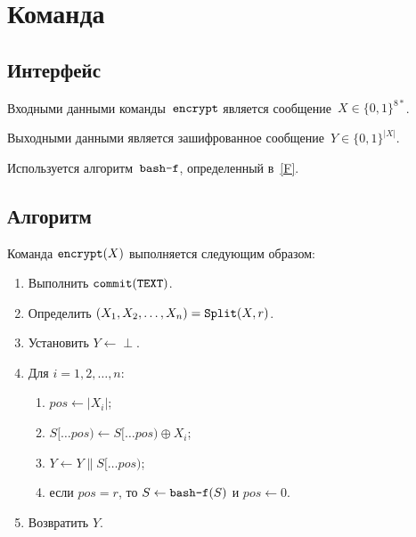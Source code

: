 \section{Команда }\label{PRG.Encrypt}

\subsection{Интерфейс}\label{PRG.Encrypt.IFace}

Входными данными команды~$\texttt{encrypt}$ является 
сообщение~$X\in\{0,1\}^{8*}$.

Выходными данными является зашифрованное сообщение~$Y\in\{0,1\}^{|X|}$.

Используется алгоритм~$\texttt{bash-f}$, определенный в~\ref{F}.

\subsection{Алгоритм}\label{PRG.Encrypt.Alg}

Команда $\texttt{encrypt}(X)$ выполняется следующим образом:
\begin{enumerate}
\item
Выполнить
$\texttt{commit}(\texttt{TEXT})$.
\item
Определить $(X_1,X_2,\ldots,X_n)=\mathop{\texttt{Split}}\nolimits(X,r)$.
\item
Установить $Y\leftarrow\perp$. 
\item
Для $i=1,2,\ldots,n$:
\begin{enumerate}
\item
$pos\leftarrow |X_i|$;
\item
$S[\dots pos)\leftarrow S[\dots pos)\oplus X_i$;
\item
$Y\leftarrow Y\parallel S[\dots pos)$;
\item
если $pos=r$, то 
$S\leftarrow\texttt{bash-f}(S)$ и $pos\leftarrow 0$.
\end{enumerate}
\item
Возвратить $Y$.
\end{enumerate}
